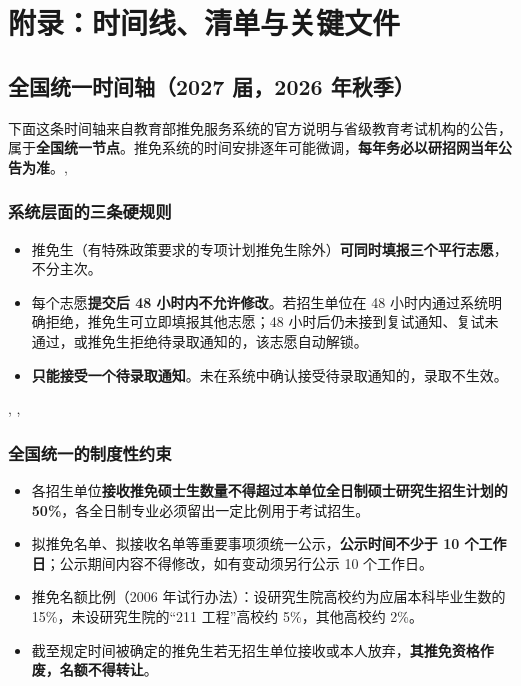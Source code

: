 \chapter{附录：时间线、清单与关键文件}
\label{app:tools}

\section{全国统一时间轴（2027 届，2026 年秋季）}

下面这条时间轴来自教育部推免服务系统的官方说明与省级教育考试机构的公告，属于\textbf{全国统一节点}。推免系统的时间安排逐年可能微调，\textbf{每年务必以研招网当年公告为准}。, 

\begin{timeline}
\end{timeline}


\subsection*{系统层面的三条硬规则}

\begin{itemize}
\item 推免生（有特殊政策要求的专项计划推免生除外）\textbf{可同时填报三个平行志愿}，不分主次。
\item 每个志愿\textbf{提交后 48 小时内不允许修改}。若招生单位在 48 小时内通过系统明确拒绝，推免生可立即填报其他志愿；48 小时后仍未接到复试通知、复试未通过，或推免生拒绝待录取通知的，该志愿自动解锁。
\item \textbf{只能接受一个待录取通知}。未在系统中确认接受待录取通知的，录取不生效。
\end{itemize}

, , 

\subsection*{全国统一的制度性约束}

\begin{itemize}
\item 各招生单位\textbf{接收推免硕士生数量不得超过本单位全日制硕士研究生招生计划的 50\%}，各全日制专业必须留出一定比例用于考试招生。
\item 拟推免名单、拟接收名单等重要事项须统一公示，\textbf{公示时间不少于 10 个工作日}；公示期间内容不得修改，如有变动须另行公示 10 个工作日。
\item 推免名额比例（2006 年试行办法）：设研究生院高校约为应届本科毕业生数的 15\%，未设研究生院的“211 工程”高校约 5\%，其他高校约 2\%。
\item 截至规定时间被确定的推免生若无招生单位接收或本人放弃，\textbf{其推免资格作废，名额不得转让}。
\end{itemize}


